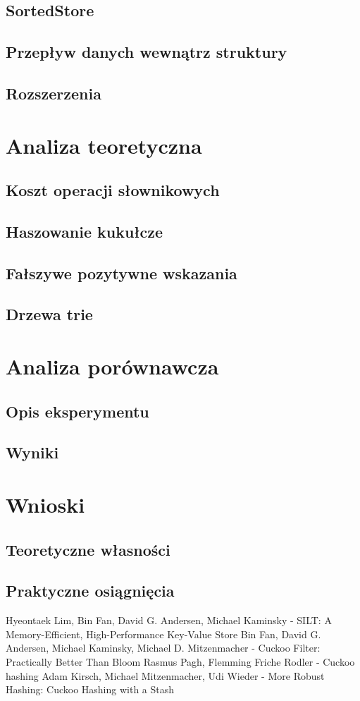 \documentclass[declaration,shortabstract,masc]{iithesis}
\begin{document}
		\section{SortedStore}
		\section{Przepływ danych wewnątrz struktury}
		\section{Rozszerzenia}
	\chapter{Analiza teoretyczna}
		\section{Koszt operacji słownikowych}
		\section{Haszowanie kukułcze}
		\section{Fałszywe pozytywne wskazania}
		\section{Drzewa trie}
	\chapter{Analiza porównawcza}
		\section{Opis eksperymentu}
		\section{Wyniki}
	\chapter{Wnioski}
		\section{Teoretyczne własności}
		\section{Praktyczne osiągnięcia}
	\begin{thebibliography}{3}
		 Hyeontaek Lim, Bin Fan, David G. Andersen, Michael Kaminsky - SILT: A Memory-Efficient, High-Performance Key-Value Store
		 Bin Fan, David G. Andersen, Michael Kaminsky, Michael D. Mitzenmacher - Cuckoo Filter: Practically Better Than Bloom
		 Rasmus Pagh, Flemming Friche Rodler - Cuckoo hashing
		 Adam Kirsch, Michael Mitzenmacher, Udi Wieder - More Robust Hashing: Cuckoo Hashing with a Stash
	\end{thebibliography}
\end{document}
